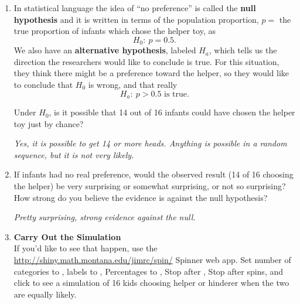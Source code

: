 \begin{enumerate}
\begin{key}
       {\it   That they are just picking one toy at random with no
         real preference for the helper or hinderer.}
\end{key}

   \item In statistical language the idea of ``no preference'' is
     called the {\bf null hypothesis}  and it is written in terms of
     the population proportion, $p=$ the true proportion of infants
     which chose the helper toy, as
      $$ H_0:\ p = 0.5.$$
     We also have an {\bf alternative hypothesis}, labeled $H_a$,
     which tells us the direction the researchers would like to
     conclude is true.  For this situation, they think there might be
     a preference toward the helper, so they would like to conclude
     that $H_0$ is wrong, and that really 
       $$H_a: \ p > 0.5 \mbox{ is true.}$$

     Under $H_0$,  is it possible that 14 out of 16
      infants could have chosen the helper toy just by chance? 
\begin{students}
  \vspace{1cm}
\end{students}

\begin{key}
{\it Yes, it is possible to get 14 or more heads. Anything is
  possible in a random sequence, but it is not very likely. }
\end{key}

\item If infants had no real preference, would the observed result (14
  of 16 choosing the helper) be very surprising or somewhat
  surprising, or not so surprising? How strong do you believe the
  evidence is against the null hypothesis?
\begin{students}
  \vspace{2cm}
\end{students}

\begin{key}
{\it Pretty surprising, strong evidence against the null.}
\end{key}


  \item         {\bf Carry Out the Simulation}\\
     If you'd like to see that happen, use the
       \url{http://shiny.math.montana.edu/jimrc/spin/} Spinner web app. Set
        number of categories to , labels to ,
        Percentages to , Stop after , Stop after  spins, and click  to
        see a simulation of 16 kids choosing helper or hinderer when
        the two are equally likely. 
\begin{students}
  \vspace{1.5cm}
\end{students}


\end{enumerate}
